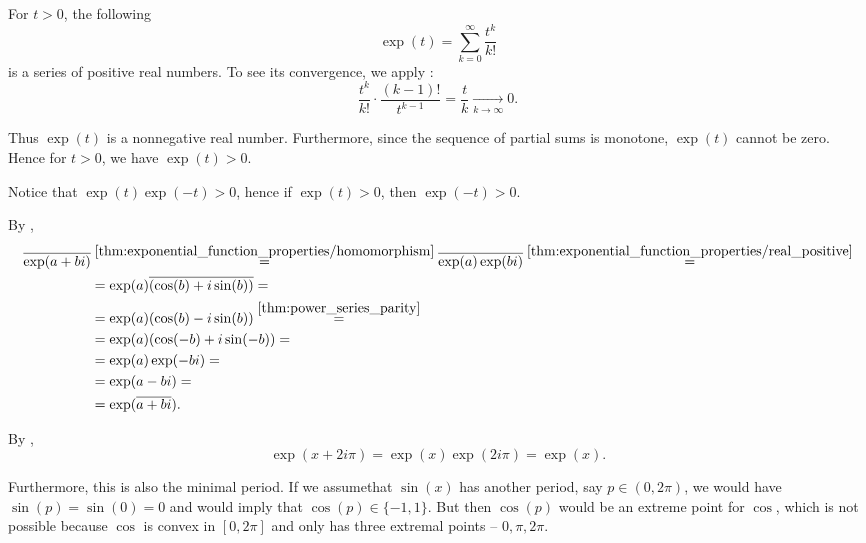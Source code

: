 \begin{RefListProof}
     For \( t > 0 \), the following
    \begin{equation*}
      \exp(t) = \sum_{k=0}^\infty \frac {t^k} {k!}
    \end{equation*}
    is a series of positive real numbers. To see its convergence, we apply :
    \begin{equation*}
      \frac {t^k} {k!} \cdot \frac {(k-1)!} {t^{k-1}}
      =
      \frac t k
      \xrightarrow[k \to \infty]{} 0.
    \end{equation*}

    Thus \( \exp(t) \) is a nonnegative real number. Furthermore, since the sequence of partial sums is monotone, \( \exp(t) \) cannot be zero. Hence for \( t > 0 \), we have \( \exp(t) > 0 \).

    Notice that \( \exp(t) \exp(-t) > 0 \), hence if \( \exp(t) > 0 \), then \( \exp(-t) > 0 \).

     By ,
    \begin{align*}
      \overline{\exp(a + bi)}
      &\overset {\ref{thm:exponential_function_properties/homomorphism}} =
      \overline{\exp(a) \exp(bi)}
      \overset {\ref{thm:exponential_function_properties/real_positive}} = \\ &=
      \exp(a) \overline{(\cos(b) + i\sin(b))}
      = \\ &=
      \exp(a) (\cos(b) - i\sin(b))
      \overset {\ref{thm:power_series_parity}} = \\ &=
      \exp(a) (\cos(-b) + i\sin(-b))
      = \\ &=
      \exp(a) \exp(-bi)
      = \\ &=
      \exp(a - bi)
      = \\ &=
      \exp(\overline{a + bi}).
    \end{align*}

     By ,
    \begin{equation*}
      \exp(x + 2i\pi) = \exp(x) \exp(2i\pi) = \exp(x).
    \end{equation*}

    Furthermore, this is also the minimal period. If we assume\LEM that \( \sin(x) \) has another period, say \( p \in (0, 2\pi) \), we would have \( \sin(p) = \sin(0) = 0 \) and  would imply that \( \cos(p) \in \{ -1, 1 \} \). But then \( \cos(p) \) would be an extreme point for \( \cos \), which is not possible because \( \cos \) is convex in \( [0, 2\pi] \) and only has three extremal points -- \( 0, \pi, 2\pi \).


\end{RefListProof}
